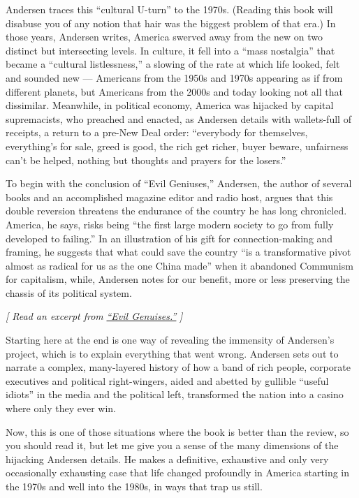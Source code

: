 Andersen traces this ``cultural U-turn'' to the 1970s. (Reading this
book will disabuse you of any notion that hair was the biggest problem
of that era.) In those years, Andersen writes, America swerved away from
the new on two distinct but intersecting levels. In culture, it fell
into a ``mass nostalgia'' that became a ``cultural listlessness,'' a
slowing of the rate at which life looked, felt and sounded new ---
Americans from the 1950s and 1970s appearing as if from different
planets, but Americans from the 2000s and today looking not all that
dissimilar. Meanwhile, in political economy, America was hijacked by
capital supremacists, who preached and enacted, as Andersen details with
wallets-full of receipts, a return to a pre-New Deal order: ``everybody
for themselves, everything's for sale, greed is good, the rich get
richer, buyer beware, unfairness can't be helped, nothing but thoughts
and prayers for the losers.''

To begin with the conclusion of ``Evil Geniuses,'' Andersen, the author
of several books and an accomplished magazine editor and radio host,
argues that this double reversion threatens the endurance of the country
he has long chronicled. America, he says, risks being ``the first large
modern society to go from fully developed to failing.'' In an
illustration of his gift for connection-making and framing, he suggests
that what could save the country ``is a transformative pivot almost as
radical for us as the one China made'' when it abandoned Communism for
capitalism, while, Andersen notes for our benefit, more or less
preserving the chassis of its political system.

\emph{{[} Read an excerpt from}
\href{https://www.nytimes3xbfgragh.onion/2020/08/11/books/review/evil-genuises-by-kurt-andersen-an-excerpt.html}{\emph{``Evil
Genuises.''}} \emph{{]}}

Starting here at the end is one way of revealing the immensity of
Andersen's project, which is to explain everything that went wrong.
Andersen sets out to narrate a complex, many-layered history of how a
band of rich people, corporate executives and political right-wingers,
aided and abetted by gullible ``useful idiots'' in the media and the
political left, transformed the nation into a casino where only they
ever win.

Now, this is one of those situations where the book is better than the
review, so you should read it, but let me give you a sense of the many
dimensions of the hijacking Andersen details. He makes a definitive,
exhaustive and only very occasionally exhausting case that life changed
profoundly in America starting in the 1970s and well into the 1980s, in
ways that trap us still.

